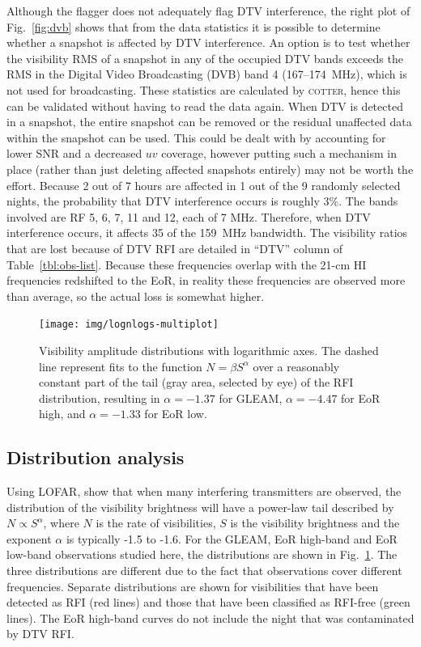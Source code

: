 \documentclass{pasa}
\begin{document}
Although the flagger does not adequately flag DTV interference, the right plot of Fig.~\ref{fig:dvb} shows that from the data statistics it is possible to determine whether a snapshot is affected by DTV interference. An option is to test whether the visibility RMS of a snapshot in any of the occupied DTV bands exceeds the RMS in the Digital Video Broadcasting (DVB) band 4 (167--174~MHz), which is not used for broadcasting. These statistics are calculated by \textsc{cotter}, hence this can be validated without having to read the data again. When DTV is detected in a snapshot, the entire snapshot can be removed or the residual unaffected data within the snapshot can be used. This could be dealt with by accounting for lower SNR and a decreased $uv$ coverage, however putting such a mechanism in place (rather than just deleting affected snapshots entirely) may not be worth the effort. Because 2 out of 7 hours are affected in 1 out of the 9 randomly selected nights, the probability that DTV interference occurs is roughly 3\%. The bands involved are RF 5, 6, 7, 11 and 12, each of 7 MHz. Therefore, when DTV interference occurs, it affects 35 of the 159~MHz bandwidth. The visibility ratios that are lost because of DTV RFI are detailed in ``DTV'' column of Table~\ref{tbl:obs-list}. Because these frequencies overlap with the 21-cm HI frequencies redshifted to the EoR, in reality these frequencies are observed more than average, so the actual loss is somewhat higher.

\noindent\begin{figure}
\begin{center}\hspace*{-0.2cm}\texttt{[image: img/lognlogs-multiplot]}
\caption{Visibility amplitude distributions with logarithmic axes. The dashed line represent fits to the function $N=\beta S^\alpha$ over a reasonably constant part of the tail (gray area, selected by eye) of the RFI distribution, resulting in $\alpha=-1.37$ for GLEAM, $\alpha=-4.47$ for EoR high, and $\alpha=-1.33$ for EoR low.}
\label{fig:lognlogs}
\end{center}
\end{figure}

\subsection{Distribution analysis}
Using LOFAR, \citet{offringa-rfi-distributions} show that when many interfering transmitters are observed, the distribution of the visibility brightness will have a power-law tail described by $N\propto S^\alpha$, where $N$ is the rate of visibilities, $S$ is the visibility brightness and the exponent $\alpha$ is typically -1.5 to -1.6. For the GLEAM, EoR high-band and EoR low-band observations studied here, the distributions are shown in Fig.~\ref{fig:lognlogs}. The three distributions are different due to the fact that observations cover different frequencies.  Separate distributions are shown for visibilities that have been detected as RFI (red lines) and those that have been classified as RFI-free (green lines). The EoR high-band curves do not include the night that was contaminated by DTV RFI.
\end{document}
